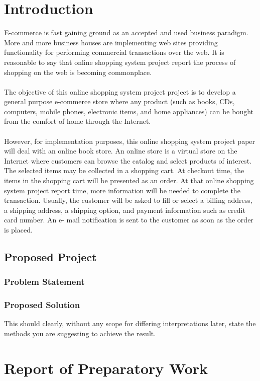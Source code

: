 \documentclass[11pt]{report}
\begin{document}
\chapter {Introduction}
\label{intro}
E-commerce is fast gaining ground as an accepted and used business paradigm. More and more business houses are implementing web sites providing functionality for performing commercial transactions over the web. It is reasonable to say that online shopping system project report the process of shopping on the web is becoming commonplace.\\
\\
The objective of this online shopping system project project is to develop a general purpose e-commerce store where any product (such as books, CDs, computers, mobile phones, electronic items, and home appliances) can be bought from the comfort of home through the Internet.\\
\\
However, for implementation purposes, this online shopping system project paper will deal with an online book store.
An online store is a virtual store on the Internet where customers can browse the catalog and select products of interest. The selected items may be collected in a shopping cart. At checkout time, the items in the shopping cart will be presented as an order. At that online shopping system project report time, more information will be needed to complete the transaction. Usually, the customer will be asked to fill or select a billing address, a shipping address, a shipping option, and payment information such as credit card number. An e- mail notification is sent to the customer as soon as the order is placed.


\section{Proposed Project}
\subsection{\label{ps}Problem Statement}

\subsection{Proposed Solution}
This should clearly, without any scope for differing interpretations later, state the methods you are suggesting to achieve the result.
\chapter{\label{work}Report of Preparatory Work }
\end{document}
